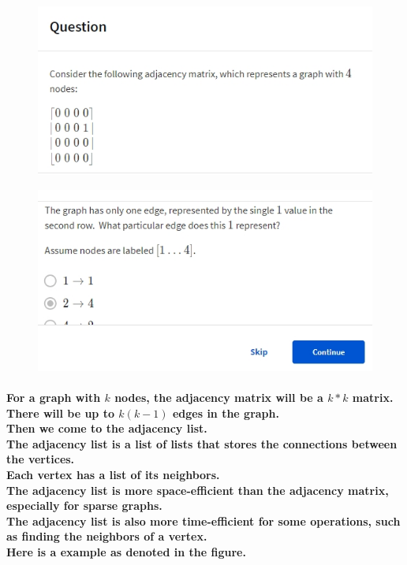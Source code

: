 \documentclass{article}
\begin{document}
\begin{figure}[H]
    \includegraphics[width=\textwidth]{graphquestion1-1.png}
\end{figure}

\begin{figure}[H]
    \includegraphics[width=\textwidth]{graphquestion1-2.png}
\end{figure}

\paragraph{
    For a graph with $k$ nodes, the adjacency matrix will be a $k*k$ matrix.\\
    There will be up to $k(k-1)$ edges in the graph.\\
    Then we come to the adjacency list.\\
    The adjacency list is a list of lists that stores the connections between the vertices.\\
    Each vertex has a list of its neighbors.\\
    The adjacency list is more space-efficient than the adjacency matrix, 
    especially for sparse graphs.\\
    The adjacency list is also more time-efficient for some operations, 
    such as finding the neighbors of a vertex.\\
    Here is a example as denoted in the figure.\\
}
\end{document}
